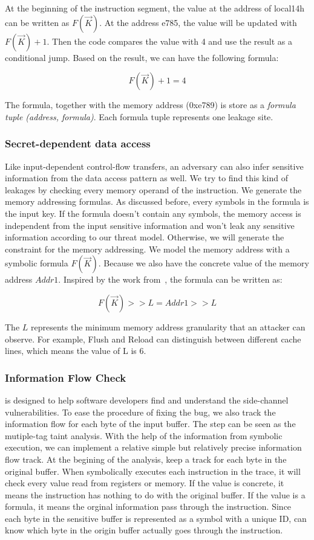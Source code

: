 At the beginning of the instruction segment, the value at the 
address of local14h can be written as $F(\vec{K})$. At the address e785, 
the value will be updated with $F(\vec{K})+1$. Then the code compares 
the value with 4 and use the result as a conditional jump. 
Based on the result, we can have the following formula:

$$F(\vec{K}) + 1 = 4$$

The formula, together with the memory address (0xe789) is store
as a \textit{formula tuple (address, formula)}. 
Each formula tuple represents one leakage site.

\subsubsection{Secret-dependent data access}
Like input-dependent control-flow transfers, an adversary can also infer 
sensitive information from the data access pattern as well. 
We try to find this kind of leakages by checking 
every memory operand of the instruction. We generate the memory addressing 
formulas. As discussed before, every symbols in the formula is the input key. 
If the formula doesn’t contain any symbols, the memory access is independent 
from the input sensitive information and won’t leak any sensitive information 
according to our threat model. Otherwise, we will generate the constraint for
the memory addressing. We model the memory address with a symbolic formula 
$F(\vec{K})$. 
Because we also have the concrete value of the memory address $Addr1$. 
Inspired by the work from~\cite{203878}, the formula can be written as:

$$F(\vec{K}) >> L = Addr1 >> L$$

The $L$ represents the minimum memory address granularity that an attacker 
can observe. For example, Flush and Reload can distinguish between different
cache lines, which means the value of L is 6.

\subsubsection{Information Flow Check}
\tool{} is designed to help software developers find and understand the 
side-channel vulnerabilities. To ease the procedure of fixing the bug,
we also track the information flow for each byte of the input
buffer. 
The step can be seen as the mutiple-tag taint analysis.
With the help of the information from symbolic execution, we can implement
a relative simple but relatively precise information flow track.
At the begining of the analysis, \tool{} keep a track for each byte 
in the original buffer. When \tool{} symbolically executes each
instruction in the trace, it will check every value read from
registers or memory. If the value is concrete, it means the
instruction has nothing to do with the original buffer.
If the value is a formula, it means the orginal information
pass through the instruction. Since each byte in the sensitive
buffer is represented as a symbol with a unique ID, \tool{} can
know which byte in the origin buffer actually goes through the
instruction.

